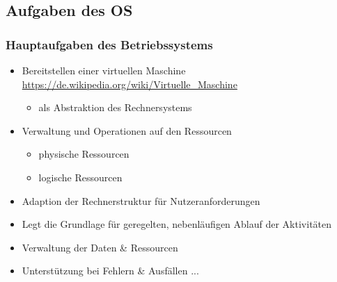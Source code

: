 \documentclass[xcolor=dvipsnames,aspectratio=169]{beamer}
\begin{document}
\subsection{Aufgaben des OS}
\begin{frame}
	\frametitle{Hauptaufgaben des Betriebssystems}
	\begin{itemize}
		\item Bereitstellen einer virtuellen Maschine \url{https://de.wikipedia.org/wiki/Virtuelle_Maschine}
		\begin{itemize}
			\item als Abstraktion des Rechnersystems
		\end{itemize}
		\item Verwaltung und Operationen auf den Ressourcen
		\begin{itemize}
			\item physische Ressourcen
			\item logische Ressourcen
		\end{itemize}
		\item Adaption der Rechnerstruktur für Nutzeranforderungen
		\item Legt die Grundlage für geregelten, nebenläufigen Ablauf der Aktivitäten
		\item Verwaltung der Daten \& Ressourcen
		\item Unterstützung bei Fehlern \& Ausfällen ...
	\end{itemize}
\end{frame}
\end{document}
